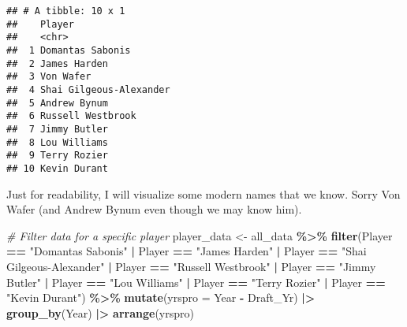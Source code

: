 \documentclass[
]{article}
\newenvironment{Shaded}{\begin{snugshade}}{\end{snugshade}}
\newcommand{\AttributeTok}[1]{\textcolor[rgb]{0.13,0.29,0.53}{#1}}
\newcommand{\CommentTok}[1]{\textcolor[rgb]{0.56,0.35,0.01}{\textit{#1}}}
\newcommand{\FunctionTok}[1]{\textcolor[rgb]{0.13,0.29,0.53}{\textbf{#1}}}
\newcommand{\NormalTok}[1]{#1}
\newcommand{\OtherTok}[1]{\textcolor[rgb]{0.56,0.35,0.01}{#1}}
\newcommand{\SpecialCharTok}[1]{\textcolor[rgb]{0.81,0.36,0.00}{\textbf{#1}}}
\newcommand{\StringTok}[1]{\textcolor[rgb]{0.31,0.60,0.02}{#1}}
\begin{document}
\begin{verbatim}
## # A tibble: 10 x 1
##    Player                 
##    <chr>                  
##  1 Domantas Sabonis       
##  2 James Harden           
##  3 Von Wafer              
##  4 Shai Gilgeous-Alexander
##  5 Andrew Bynum           
##  6 Russell Westbrook      
##  7 Jimmy Butler           
##  8 Lou Williams           
##  9 Terry Rozier           
## 10 Kevin Durant
\end{verbatim}

Just for readability, I will visualize some modern names that we know.
Sorry Von Wafer (and Andrew Bynum even though we may know him).

\begin{Shaded}
\begin{Highlighting}[]
\CommentTok{\# Filter data for a specific player}
\NormalTok{player\_data }\OtherTok{\textless{}{-}}\NormalTok{ all\_data }\SpecialCharTok{\%\textgreater{}\%}
  \FunctionTok{filter}\NormalTok{(Player }\SpecialCharTok{==} \StringTok{"Domantas Sabonis"} \SpecialCharTok{|}\NormalTok{ Player }\SpecialCharTok{==} \StringTok{"James Harden"} \SpecialCharTok{|}\NormalTok{ Player }\SpecialCharTok{==} \StringTok{"Shai Gilgeous{-}Alexander"} \SpecialCharTok{|}\NormalTok{ Player }\SpecialCharTok{==} \StringTok{"Russell Westbrook"} \SpecialCharTok{|}\NormalTok{ Player }\SpecialCharTok{==} \StringTok{"Jimmy Butler"} \SpecialCharTok{|}\NormalTok{ Player }\SpecialCharTok{==} \StringTok{"Lou Williams"} \SpecialCharTok{|}\NormalTok{ Player }\SpecialCharTok{==} \StringTok{"Terry Rozier"} \SpecialCharTok{|}\NormalTok{ Player }\SpecialCharTok{==} \StringTok{"Kevin Durant"}\NormalTok{) }\SpecialCharTok{\%\textgreater{}\%}
  \FunctionTok{mutate}\NormalTok{(}\AttributeTok{yrspro =}\NormalTok{ Year }\SpecialCharTok{{-}}\NormalTok{ Draft\_Yr) }\SpecialCharTok{|\textgreater{}}
  \FunctionTok{group\_by}\NormalTok{(Year) }\SpecialCharTok{|\textgreater{}}
\FunctionTok{arrange}\NormalTok{(yrspro)}
\end{Highlighting}
\end{Shaded}
\end{document}
